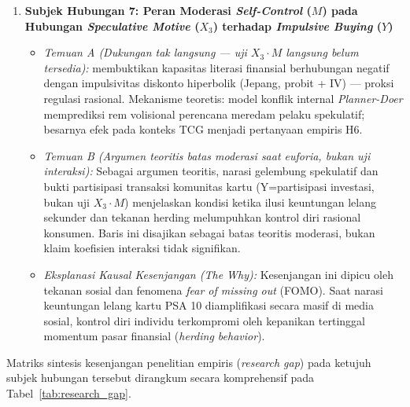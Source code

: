 \documentclass[12pt,a4paper]{article}
\numberwithin{equation}{section}
\numberwithin{table}{section}
\numberwithin{figure}{section}
\begin{document}
\begin{enumerate}
  \item \textbf{Subjek Hubungan 7: Peran Moderasi \emph{Self-Control} ($M$) pada Hubungan \emph{Speculative Motive} ($X_3$) terhadap \emph{Impulsive Buying} ($Y$)}
  \begin{itemize}
    \item \emph{Temuan A (Dukungan tak langsung — uji $X_3 \cdot M$ langsung belum tersedia):} \citet{katauke2023financial} membuktikan kapasitas literasi finansial berhubungan negatif dengan impulsivitas diskonto hiperbolik (Jepang, probit + IV) — proksi regulasi rasional. Mekanisme teoretis: model konflik internal \emph{Planner-Doer} \citep{thaler1981economic} memprediksi rem volisional perencana meredam pelaku spekulatif; besarnya efek pada konteks TCG menjadi pertanyaan empiris H6.
    \item \emph{Temuan B (Argumen teoritis batas moderasi saat euforia, bukan uji interaksi):} Sebagai argumen teoritis, narasi gelembung spekulatif \citet{shiller2000irrational} dan bukti partisipasi transaksi komunitas kartu \citet{aryadi2024personal} (Y=partisipasi investasi, bukan uji $X_3 \cdot M$) menjelaskan kondisi ketika ilusi keuntungan lelang sekunder dan tekanan herding melumpuhkan kontrol diri rasional konsumen. Baris ini disajikan sebagai batas teoritis moderasi, bukan klaim koefisien interaksi tidak signifikan.
    \item \emph{Eksplanasi Kausal Kesenjangan (\emph{The Why}):} Kesenjangan ini dipicu oleh tekanan sosial dan fenomena \emph{fear of missing out} (FOMO). Saat narasi keuntungan lelang kartu PSA 10 diamplifikasi secara masif di media sosial, kontrol diri individu terkompromi oleh kepanikan tertinggal momentum pasar finansial (\emph{herding behavior}).
  \end{itemize}
\end{enumerate}

Matriks sintesis kesenjangan penelitian empiris (\emph{research gap}) pada ketujuh subjek hubungan tersebut dirangkum secara komprehensif pada Tabel~\ref{tab:research_gap}.
\end{document}
